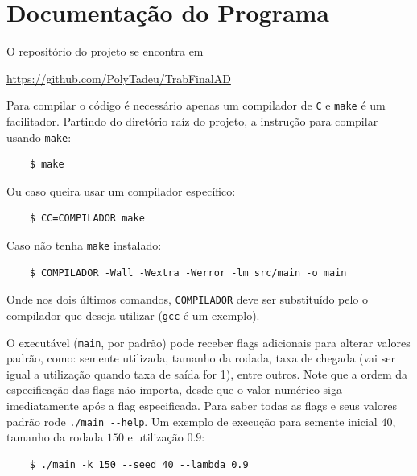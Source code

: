 \documentclass[a4paper]{article}
\newcommand{\inlcode}{\texttt}
\newcommand{\lang}{\texttt}
\begin{document}
\newpage
\section{Documentação do Programa}
O repositório do projeto se encontra em \par
\url{https://github.com/PolyTadeu/TrabFinalAD}

Para compilar o código é necessário apenas
um compilador de \lang{C}
e \inlcode{make} é um facilitador.
Partindo do diretório raíz do projeto,
a instrução para compilar usando \inlcode{make}:
\begin{verbatim}
    $ make
\end{verbatim}
Ou caso queira usar um compilador específico:
\begin{verbatim}
    $ CC=COMPILADOR make
\end{verbatim}
Caso não tenha \inlcode{make} instalado:
\begin{verbatim}
    $ COMPILADOR -Wall -Wextra -Werror -lm src/main -o main
\end{verbatim}
Onde nos dois últimos comandos,
\verb.COMPILADOR. deve ser substituído
pelo o compilador que deseja utilizar
(\inlcode{gcc} é um exemplo).

O executável (\inlcode{main}, por padrão)
pode receber flags adicionais para alterar valores padrão,
como: semente utilizada, tamanho da rodada,
taxa de chegada
(vai ser igual a utilização quando taxa de saída for 1),
entre outros.
Note que a ordem da especificação das flags não importa,
desde que o valor numérico siga imediatamente após
a flag especificada.
Para saber todas as flags e seus valores padrão
rode \inlcode{./main -{}-help}.
Um exemplo de execução para semente inicial \(40\),
tamanho da rodada \(150\) e utilização \(0.9\):
\begin{verbatim}
    $ ./main -k 150 --seed 40 --lambda 0.9
\end{verbatim}
\end{document}
